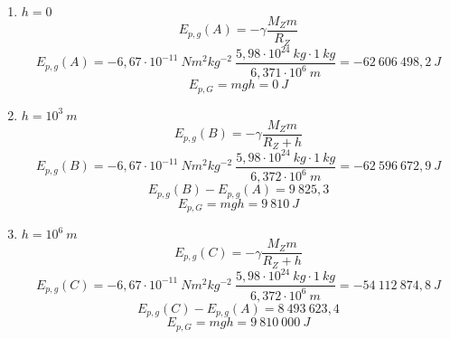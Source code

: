
\begin{enumerate}[label=\alph*)]
 \item $h=0$
 $$ E_{p,g}(A) = -\gamma\frac{M_Zm}{R_Z}  $$
 $$  E_{p,g}(A) =- 6,67\cdot  10^{-11}\ Nm^2kg^{-2}\ \frac{5,98 \cdot  10^{24}\ kg\cdot 1 \ kg}{ 6,371 \cdot 10^6\ m}
 = - 62\ 606\ 498,2\ J$$
 $$E_{p,G}=mgh=0\ J $$
 \item $h=10^3\ m$
 $$ E_{p,g}(B) = -\gamma\frac{M_Zm}{R_Z+h}  $$
 $$  E_{p,g}(B) =- 6,67\cdot  10^{-11}\ Nm^2kg^{-2}\ \frac{5,98 \cdot  10^{24}\ kg\cdot 1 \ kg}{ 6,372 \cdot 10^6\ m}
 = - 62\ 596\ 672,9\ J$$
 $$ E_{p,g}(B)- E_{p,g}(A)=9\ 825,3 $$
 $$E_{p,G}=mgh=9\ 810\ J $$
 \item $h=10^6\ m$
 $$ E_{p,g}(C) = -\gamma\frac{M_Zm}{R_Z+h}  $$
 $$  E_{p,g}(C) =- 6,67\cdot  10^{-11}\ Nm^2kg^{-2}\ \frac{5,98 \cdot  10^{24}\ kg\cdot 1 \ kg}{ 6,372 \cdot 10^6\ m}
 = - 54\ 112\ 874,8\ J$$
 $$ E_{p,g}(C)- E_{p,g}(A)=8\ 493\ 623,4 $$
 $$E_{p,G}=mgh=9\ 810\ 000\ J $$
 
 
 
 
\end{enumerate}



